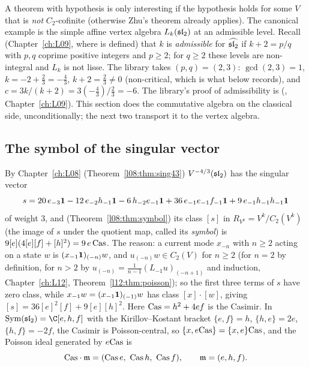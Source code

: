A theorem with hypothesis  is only interesting if the hypothesis holds for some $V$ that is
\emph{not} $C_2$-cofinite (otherwise Zhu's theorem already applies). The canonical example is the simple affine vertex
algebra $L_k(\mathfrak{sl}_2)$ at an admissible level. Recall (Chapter~\ref{ch:L09}, where  is defined)
that $k$ is \emph{admissible} for $\widehat{\mathfrak{sl}_2}$ if $k+2 = p/q$ with $p,q$ coprime positive integers and $p\ge2$;
for $q\ge2$ these levels are non-integral and $L_k$ is not lisse. The library takes $(p,q) = (2,3)$: $\gcd(2,3)=1$,
$k = -2+\frac23 = -\frac43$, $k+2 = \frac23\ne0$ (non-critical, which is what  below records), and
$c = 3k/(k+2) = 3(-\frac43)/\frac23 = -6$. The library's proof of admissibility is
\allowbreak{}\allowbreak{}\allowbreak{} (, Chapter~\ref{ch:L09}). This section does the commutative algebra on the classical side, unconditionally; the
next two transport it to the vertex algebra.

\subsection{The symbol of the singular vector}

By Chapter~\ref{ch:L08} (Theorem~\ref{l08:thm:sing43}) $V^{-4/3}(\mathfrak{sl}_2)$ has the singular vector
\begin{equation*}
s = 20\,e_{-3}\mathbf{1} - 12\,e_{-2}h_{-1}\mathbf{1} - 6\,h_{-2}e_{-1}\mathbf{1} + 36\,e_{-1}e_{-1}f_{-1}\mathbf{1}
+ 9\,e_{-1}h_{-1}h_{-1}\mathbf{1}
\end{equation*}
of weight $3$, and (Theorem~\ref{l08:thm:symbol}) its class $[s]$ in $R_{V^k} = V^k/C_2(V^k)$ (the image of $s$ under the quotient map, called its
\emph{symbol}) is $9[e](4[e][f]+[h]^2) = 9\,e\,\mathrm{Cas}$. The reason: a current mode $x_{-n}$ with $n\ge2$ acting on a state
$w$ is $(x_{-1}\mathbf{1})_{(-n)}w$, and $u_{(-n)}w\in C_2(V)$ for $n\ge2$ (for $n=2$ by definition, for $n>2$ by
$u_{(-n)} = \frac1{n-1}(L_{-1}u)_{(-n+1)}$ and induction, Chapter~\ref{ch:L12}, Theorem~\ref{l12:thm:poisson}); so the first three terms of
$s$ have zero class, while $x_{-1}w = (x_{-1}\mathbf{1})_{(-1)}w$ has class $[x]\cdot[w]$, giving
$[s] = 36[e]^2[f] + 9[e][h]^2$. Here $\mathrm{Cas} = h^2+4ef$ is the Casimir. In
$\operatorname{Sym}(\lsixteensl) = \C[e,h,f]$ with the Kirillov--Kostant bracket $\{e,f\} = h$, $\{h,e\} = 2e$,
$\{h,f\} = -2f$, the Casimir is Poisson-central, so $\{x, e\mathrm{Cas}\} = \{x,e\}\mathrm{Cas}$, and the Poisson ideal
generated by $e\mathrm{Cas}$ is
\begin{equation*}
\lsixteenCas\cdot\mathfrak m = (\lsixteenCas\,e,\ \lsixteenCas\,h,\ \lsixteenCas\,f),\qquad \mathfrak m = (e,h,f).
\end{equation*}

